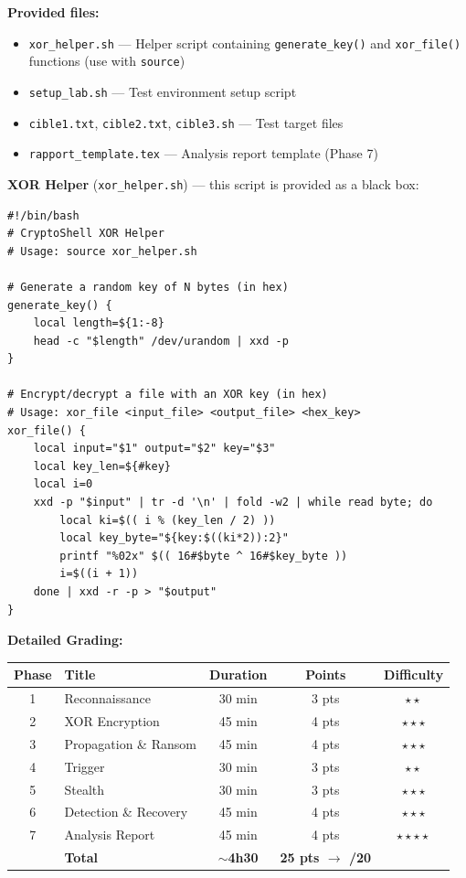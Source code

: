 \documentclass[a4paper,11pt]{article}
\theoremstyle{plain}
\theoremstyle{definition}
\begin{document}
\medskip
\noindent\textbf{Provided files:}
\begin{itemize}
    \item \texttt{xor\_helper.sh} --- Helper script containing \texttt{generate\_key()} and \texttt{xor\_file()} functions (use with \texttt{source})
    \item \texttt{setup\_lab.sh} --- Test environment setup script
    \item \texttt{cible1.txt}, \texttt{cible2.txt}, \texttt{cible3.sh} --- Test target files
    \item \texttt{rapport\_template.tex} --- Analysis report template (Phase 7)
\end{itemize}

\medskip
\noindent\textbf{XOR Helper} (\texttt{xor\_helper.sh}) --- this script is provided as a black box:
\begin{lstlisting}[title=xor\_helper.sh (provided)]
#!/bin/bash
# CryptoShell XOR Helper
# Usage: source xor_helper.sh

# Generate a random key of N bytes (in hex)
generate_key() {
    local length=${1:-8}
    head -c "$length" /dev/urandom | xxd -p
}

# Encrypt/decrypt a file with an XOR key (in hex)
# Usage: xor_file <input_file> <output_file> <hex_key>
xor_file() {
    local input="$1" output="$2" key="$3"
    local key_len=${#key}
    local i=0
    xxd -p "$input" | tr -d '\n' | fold -w2 | while read byte; do
        local ki=$(( i % (key_len / 2) ))
        local key_byte="${key:$((ki*2)):2}"
        printf "%02x" $(( 16#$byte ^ 16#$key_byte ))
        i=$((i + 1))
    done | xxd -r -p > "$output"
}
\end{lstlisting}

\bigskip
\noindent\textbf{Detailed Grading:}
\begin{center}
\begin{tabular}{clccc}
\toprule
\textbf{Phase} & \textbf{Title} & \textbf{Duration} & \textbf{Points} & \textbf{Difficulty} \\
\midrule
1 & Reconnaissance & 30 min & 3 pts & $\star\star$ \\
2 & XOR Encryption & 45 min & 4 pts & $\star\star\star$ \\
3 & Propagation \& Ransom & 45 min & 4 pts & $\star\star\star$ \\
4 & Trigger & 30 min & 3 pts & $\star\star$ \\
5 & Stealth & 30 min & 3 pts & $\star\star\star$ \\
6 & Detection \& Recovery & 45 min & 4 pts & $\star\star\star$ \\
7 & Analysis Report & 45 min & 4 pts & $\star\star\star\star$ \\
\midrule
& \textbf{Total} & \textbf{$\sim$4h30} & \textbf{25 pts $\to$ /20} & \\
\bottomrule
\end{tabular}
\end{center}
\end{document}
